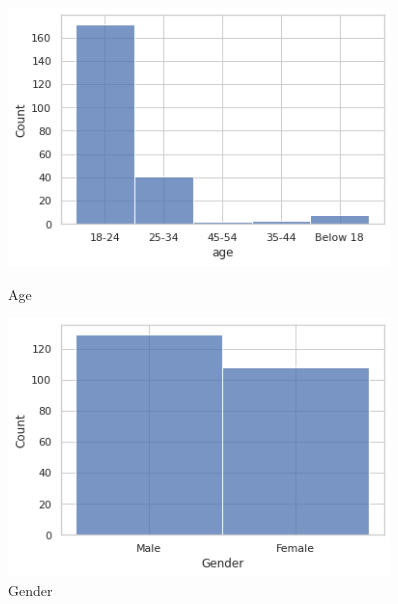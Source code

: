 \documentclass[12pt, english]{article}
\begin{document}
\begin{figure}[H]
    \centering
    \begin{minipage}{0.45\textwidth}
        \centering
        \includegraphics[width=0.9\textwidth]{images/age.png} %
        \caption{Age}
    \end{minipage}\hfill
    \begin{minipage}{0.45\textwidth}
        \centering
        \includegraphics[width=0.9\textwidth]{images/gender.png} %
        \caption{Gender}
    \end{minipage}
\end{figure}
\end{document}
